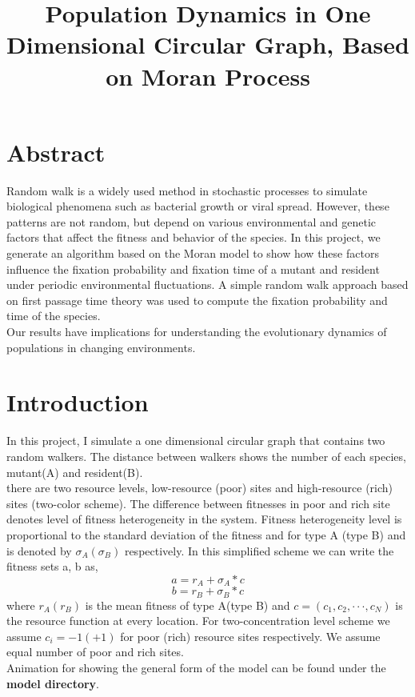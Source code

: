 \documentclass{article}
\title{Population Dynamics in One Dimensional Circular Graph, Based on Moran Process}
\date{}
\begin{document}
\maketitle
\section{Abstract}
Random walk is a widely used method in stochastic processes to simulate biological phenomena such as bacterial growth or viral spread. However, these patterns are not random, but depend on various environmental and genetic factors that affect the fitness and behavior of the species. In this project, we generate an algorithm based on the Moran model to show how these factors influence the fixation probability and fixation time of a mutant and resident under periodic environmental fluctuations. A simple random walk approach based on first passage time theory was used to compute the fixation probability and time of the species.\\
Our results have implications for understanding the evolutionary dynamics of populations in changing environments.

\section{Introduction}
In this project, I simulate a one dimensional circular graph that contains two random walkers. The distance between walkers shows the number of each species, mutant(A) and resident(B).\\
there are two resource levels, low-resource
(poor) sites and high-resource (rich) sites (two-color scheme). The difference between fitnesses in poor and rich site denotes level of fitness heterogeneity in the system. Fitness heterogeneity level is proportional to the standard deviation of the fitness and for type A (type B) and is denoted by $\sigma_A(\sigma_B)$ respectively.
In this simplified scheme we can write the fitness sets a, b as,
\begin{equation}
   a = r_A + \sigma _A * c
\end{equation}
\begin{equation}
    b = r_B + \sigma _B * c
\end{equation}
where $r_A (r_B)$ is the mean fitness of type A(type B) and $c = (c_1, c_2, · · · , c_N)$ is the resource function at every location. For two-concentration level scheme we assume $c_i = −1 (+1)$ for poor (rich) resource sites respectively. We assume equal number of poor and rich sites.\\
Animation for showing the general form of the model can be found under the \textbf{model directory}.
\end{document}
